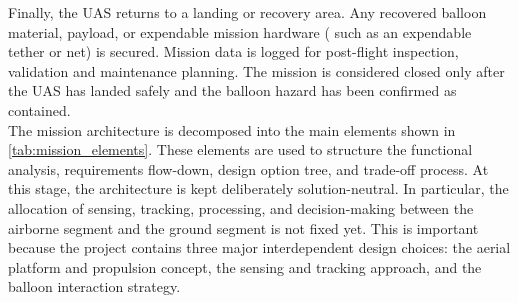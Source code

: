 Finally, the UAS returns to a landing or recovery area. Any recovered balloon material, payload, or expendable mission hardware ( such as an expendable tether or net)  is secured. Mission data is logged for post-flight inspection, validation and maintenance planning. The mission is considered closed only after the UAS has landed safely and the balloon hazard has been confirmed as contained.\\

The mission architecture is decomposed into the main elements shown in \autoref{tab:mission_elements}. These elements are used to structure the functional analysis, requirements flow-down, design option tree, and trade-off process. At this stage, the architecture is kept deliberately solution-neutral. In particular, the allocation of sensing, tracking, processing, and decision-making between the airborne segment and the ground segment is not fixed yet. This is important because the project contains three major interdependent design choices: the aerial platform and propulsion concept, the sensing and tracking approach, and the balloon interaction strategy.\\





